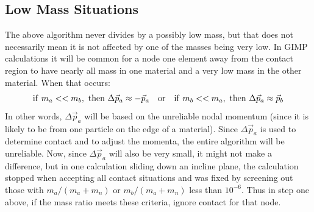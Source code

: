 \documentclass[11pt]{article}
\begin{document}
\subsection{Low Mass Situations}

The above algorithm never divides by a possibly low mass, but that does not necessarily mean it is not affected by one of the masses being very low. In GIMP calculations it will be common for a node one element away from the contact region to have nearly all mass in one material and a very low mass in the other material. When that occurs:
\begin{equation}
         {\rm if\ } m_a << m_b, {\rm\ then\ } \Delta \vec p_a \approx -\vec p_a
         \quad {\rm or}\quad
         {\rm if\ } m_b << m_a, {\rm\ then\ } \Delta \vec p_a \approx \vec p_b
\end{equation}
In other words, $\Delta\vec p_a$ will be based on the unreliable nodal momentum (since it is likely to be from one particle on the edge of a material). Since $\Delta\vec p_a$ is used to determine contact and to adjust the momenta, the entire algorithm will be unreliable. Now, since $\Delta\vec p_a$ will also be very small, it might not make a difference, but in one calculation sliding down an incline plane, the calculation stopped when accepting all contact situations and was fixed by screening out those with $m_a/(m_a+m_n)$ or $m_b/(m_a+m_n)$ less than $10^{-6}$. Thus in step one above, if the mass ratio meets these criteria, ignore contact for that node.
\end{document}
